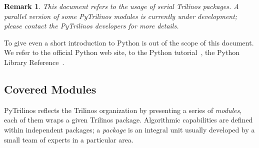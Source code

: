 \documentclass[10pt,relax]{SANDreport}
\newtheorem{remark}{Remark}
\begin{document}
\begin{remark}
This document refers to the usage of serial Trilinos packages. A parallel
version of some PyTrilinos modules is currently under development; please
contact the PyTrilinos developers for more details.
\end{remark}

To give even a short introduction to Python is out of the scope of this
document. We refer to the official Python web site, to the Python
tutorial~\cite{python-tutorial}, the Python Library
Reference~\cite{python-library-reference}.

\subsection{Covered Modules}

PyTrilinos reflects the Trilinos organization by presenting
a series of {\sl modules}, each of them wraps a given Trilinos package.
Algorithmic capabilities are defined within independent packages; a {\sl
  package} is an integral unit usually developed by a small team of experts in
  a particular area. 
\end{document}
